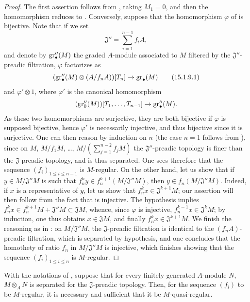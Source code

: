 \begin{proof}
The first assertion follows from , taking $M_1=0$, and then the homomorphism  reduces to .
Conversely, suppose that the homomorphism $\varphi$ of  is bijective.
Note that if we set
\[
  \mathfrak{J}''=\sum_{i=1}^{n-1}f_iA,
\]
and denote by $\operatorname{gr}''_\bullet(M)$ the graded $A$-module associated to $M$ filtered by the $\mathfrak{J}''$-preadic filtration, $\varphi$ factorizes as
\[
\label{0.15.1.9.1}
  (\operatorname{gr}''_\bullet(M)\otimes(A/f_nA))[T_n] \to \operatorname{gr}_\bullet(M)
\tag{15.1.9.1}
\]
and $\varphi'\otimes 1$, where $\varphi'$ is the canonical homomorphism
\[
  (\operatorname{gr}''_0(M))[T_1,\ldots,T_{n-1}] \to \operatorname{gr}''_\bullet(M).
\]
As these two homomorphisms are surjective, they are both bijective if $\varphi$ is supposed bijective, hence $\varphi'$ is necessarily injective, and thus bijective since it is surjective.
One can then reason by induction on $n$ (the case $n=1$ follows from ), since on $M$, $M/f_1M$, \ldots, $M/(\sum_{j=1}^{n-2}f_jM)$ the $\mathfrak{J}''$-preadic topology is finer than the $\mathfrak{J}$-preadic topology, and is thus separated.
One sees therefore that the sequence $(f_i)_{1\leq i\leq n-1}$ is $M$-regular.
On the other hand, let us show that if $y\in M/\mathfrak{J}''M$ is such that $f_n^ky\in f_n^{k+1}(M/\mathfrak{J}''M)$, then $y\in f_n(M/\mathfrak{J}''M)$.
Indeed, if $x$ is a representative of $y$, let us show that $f_n^kx\in\mathfrak{J}^{k+1}M$;
our assertion will then follow from the fact that  is injective.
The hypothesis implies $f_n^kx\in f_n^{k+1}M+\mathfrak{J}''M\subset\mathfrak{J}M$, whence, since $\varphi$ is injective, $f_n^{k-1}x\in\mathfrak{J}^kM$;
by induction, one thus obtains $x\in\mathfrak{J}M$, and finally $f_n^kx\in\mathfrak{J}^{k+1}M$.
We finish the reasoning as in :
on $M/\mathfrak{J}''M$, the $\mathfrak{J}$-preadic filtration is identical to the $(f_nA)$-preadic filtration, which is separated by hypothesis, and one concludes that the homothety of ratio $f_n$ in $M/\mathfrak{J}''M$ is injective, which finishes showing that the sequence $(f_i)_{1\leq i\leq n}$ is $M$-regular.
\end{proof}

\begin{corollary}[15.1.10]
\label{0.15.1.10}
With the notations of , suppose that for every finitely generated $A$-module $N$, $M\otimes_AN$ is separated for the $\mathfrak{J}$-preadic topology.
Then, for the sequence $(f_i)$ to be $M$-regular, it is necessary and sufficient that it be $M$-quasi-regular.
\end{corollary}

